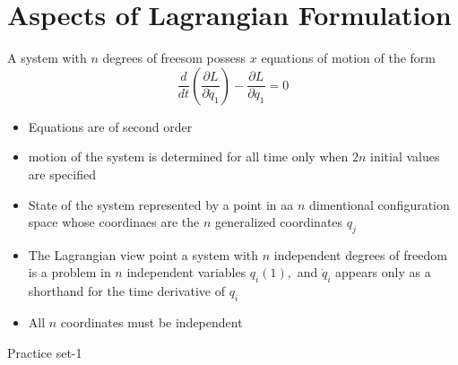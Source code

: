 \section{Aspects of Lagrangian Formulation}
A system with $n$ degrees of freesom possess $x$ equations of motion of the form
$$\frac{d}{dt}\left( \frac{\partial L}{\partial \dot{q}_1}\right)-\frac{\partial L}{\partial q_1}=0 $$
\begin{itemize}
	\item Equations are of second order
	\item motion of the system is determined for all time only when $2n$ initial values are specified
	\item State of the system represented by a point in aa $n$ dimentional configuration space whose coordinaes are the $n$ generalized coordinates $q_j$
	\item The Lagrangian view point a system with $n$ independent degrees of freedom is a problem in $n$ independent variables $q_i(1), $ and  $\dot{q}_i$ appears only as a shorthand for the time derivative of $q_i$
	\item All $n$ coordinates must be independent
\end{itemize}
\newpage
\begin{abox}
	Practice set-1
\end{abox}
